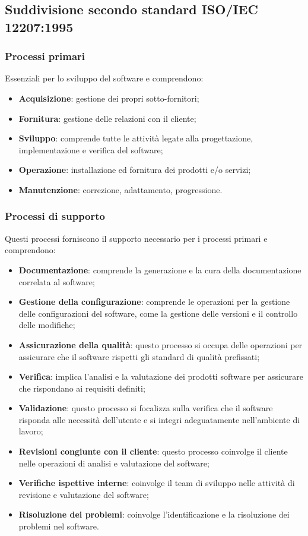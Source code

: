 \subsection{Suddivisione secondo standard ISO/IEC 12207:1995}
\subsubsection{Processi primari}
Essenziali per lo sviluppo del software e comprendono:
\begin{itemize}
    \item \textbf{Acquisizione}: gestione dei propri sotto-fornitori;
    \item \textbf{Fornitura}: gestione delle relazioni con il cliente;
    \item \textbf{Sviluppo}: comprende tutte le attività legate alla progettazione, implementazione e verifica del software;
    \item \textbf{Operazione}: installazione ed fornitura dei prodotti e/o servizi;
    \item \textbf{Manutenzione}: correzione, adattamento, progressione.
\end{itemize}
\subsubsection{Processi di supporto}
Questi processi forniscono il supporto necessario per i processi primari e comprendono:
\begin{itemize}
    \item \textbf{Documentazione}: comprende la generazione e la cura della documentazione correlata al software;
    \item \textbf{Gestione della configurazione}: comprende le operazioni per la gestione delle configurazioni del software, come la gestione delle versioni e il controllo delle modifiche;
    \item \textbf{Assicurazione della qualità}: questo processo si occupa delle operazioni per assicurare che il software rispetti gli standard di qualità prefissati;
    \item \textbf{Verifica}: implica l’analisi e la valutazione dei prodotti software per assicurare che rispondano ai requisiti definiti;
    \item \textbf{Validazione}: questo processo si focalizza sulla verifica che il software risponda alle necessità dell’utente e si integri adeguatamente nell’ambiente di lavoro;
    \item \textbf{Revisioni congiunte con il cliente}: questo processo coinvolge il cliente nelle operazioni di analisi e valutazione del software;
    \item \textbf{Verifiche ispettive interne}: coinvolge il team di sviluppo nelle attività di revisione e valutazione del software;
    \item \textbf{Risoluzione dei problemi}: coinvolge l'identificazione e la risoluzione dei problemi nel software.
\end{itemize}
